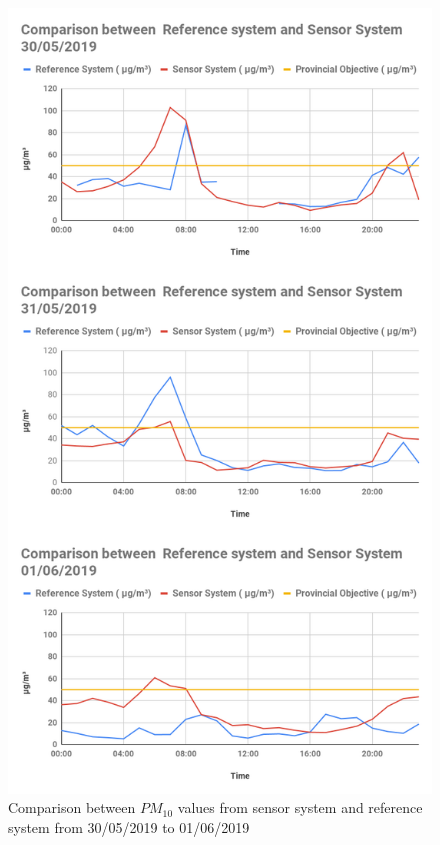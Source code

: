 \begin{figure}[h]
  
  \begin{center}
  \includegraphics[scale=0.42]{images/figure99.png}
  \end{center}
  \caption{Comparison between $PM_{10}$ values from sensor system and reference system from 30/05/2019 to 01/06/2019}
\label{PM10}
\hspace{1 cm}

\end{figure}
\clearpage


